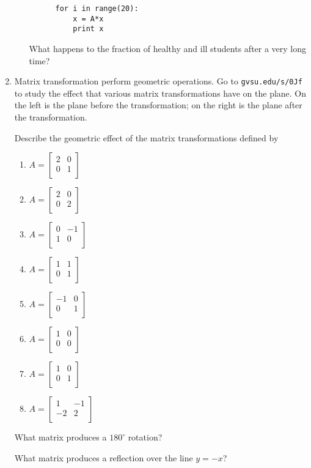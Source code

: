 \documentclass[12pt]{article}
\newcommand{\vs}[1]{\vspace{#1in}}
\newcommand{\mattwo}[4]{\left[\begin{array}{rr}#1 & #2 \\ #3 & #4 \\ \end{array}\right]}
\begin{document}
\begin{enumerate}
\begin{enumerate}[label=(\alph*)]
\begin{verbatim}
      for i in range(20):
          x = A*x
          print x

\end{verbatim}
    What happens to the fraction of healthy and ill students after a
    very long time?

    \vs{1}
        

  \end{enumerate}

  \item Matrix transformation perform geometric operations.  Go to
    {\tt gvsu.edu/s/0Jf} to study the effect that various matrix
    transformations have on the plane.  On the left is the plane
    before the transformation;  on the right is the plane after the
    transformation.

    Describe the geometric effect of the matrix transformations
    defined by

    \begin{enumerate}[label=(\alph*)]
    \item $A=\mattwo 2001$
      \vs{0.5}
    \item $A=\mattwo 2002$
      \vs{0.5}
    \item $A=\mattwo 0{-1}10$
      \vs{0.5}
    \item $A=\mattwo 1101$
      \vs{0.5}
    \item $A=\mattwo {-1}001$
      \vs{0.5}
    \item $A=\mattwo {1}000$
      \vs{0.5}
    \item $A=\mattwo 1001$
      \vs{0.5}
    \item $A=\mattwo {1}{-1}{-2}2$
      \vs{0.5}

    \end{enumerate}

    What matrix produces a $180^\circ$ rotation?

    \vs{1}
    What matrix produces a reflection over the line $y=-x$?

    \vs{1}

\end{enumerate}
\end{document}
